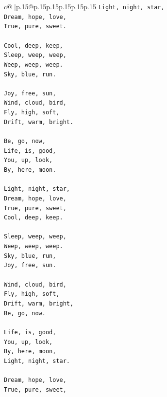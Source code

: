 \documentclass{article}
\begin{document}
{\begin{supertabular}{c@{$\;$}|p{.15\linewidth}@{}p{.15\linewidth}p{.15\linewidth}p{.15\linewidth}p{.15\linewidth}p{.15\linewidth}}
{{{\texttt{Light, night, star,} \\
\texttt{Dream, hope, love,} \\
\texttt{True, pure, sweet.} \\
\\ 
\texttt{Cool, deep, keep,} \\
\texttt{Sleep, weep, weep,} \\
\texttt{Weep, weep, weep.} \\
\texttt{Sky, blue, run.} \\
\\ 
\texttt{Joy, free, sun,} \\
\texttt{Wind, cloud, bird,} \\
\texttt{Fly, high, soft,} \\
\texttt{Drift, warm, bright.} \\
\\ 
\texttt{Be, go, now,} \\
\texttt{Life, is, good,} \\
\texttt{You, up, look,} \\
\texttt{By, here, moon.} \\
\\ 
\texttt{Light, night, star,} \\
\texttt{Dream, hope, love,} \\
\texttt{True, pure, sweet,} \\
\texttt{Cool, deep, keep.} \\
\\ 
\texttt{Sleep, weep, weep,} \\
\texttt{Weep, weep, weep.} \\
\texttt{Sky, blue, run,} \\
\texttt{Joy, free, sun.} \\
\\ 
\texttt{Wind, cloud, bird,} \\
\texttt{Fly, high, soft,} \\
\texttt{Drift, warm, bright,} \\
\texttt{Be, go, now.} \\
\\ 
\texttt{Life, is, good,} \\
\texttt{You, up, look,} \\
\texttt{By, here, moon,} \\
\texttt{Light, night, star.} \\
\\ 
\texttt{Dream, hope, love,} \\
\texttt{True, pure, sweet,} \\
}}}
\end{supertabular}}
\end{document}
